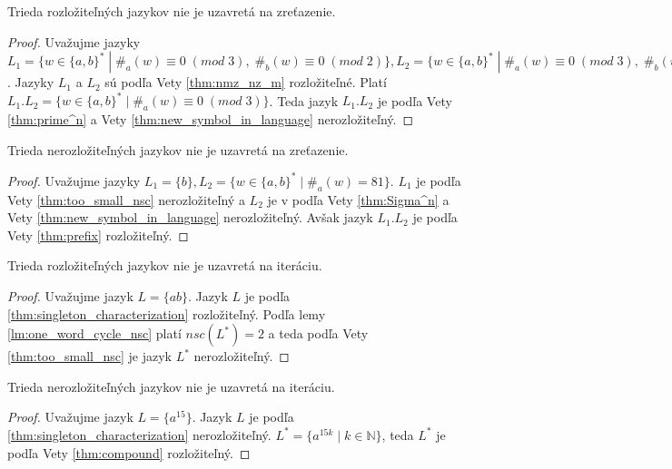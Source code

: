 \begin{theorem}
Trieda rozložiteľných jazykov nie je uzavretá na zreťazenie.
\end{theorem}

\begin{proof}
Uvažujme jazyky $ L_1 = \lbrace w \in \lbrace a,b \rbrace^* \; | \; \#_a(w) \equiv 0 \;  (mod \; 3), \; \#_b(w) \equiv 0 \; (mod \; 2) \rbrace, L_2 = \lbrace w \in \lbrace a,b \rbrace^* \; | \; \#_a(w) \equiv 0 \; (mod \; 3), \; \#_b(w) \equiv 1 \; (mod \; 2) \rbrace \cup \lbrace \varepsilon \rbrace $. Jazyky $ L_1 $ a $ L_2 $ sú podľa Vety \ref{thm:nmz_nz_m} rozložiteľné. Platí $ L_1.L_2 = \lbrace w \in \lbrace a,b \rbrace^* \; | \; \#_a(w) \equiv 0 \; (mod \; 3) \rbrace $. Teda jazyk $ L_1.L_2 $ je podľa Vety \ref{thm:prime^n} a Vety \ref{thm:new_symbol_in_language} nerozložiteľný.
\end{proof}

\begin{theorem}
Trieda nerozložiteľných jazykov nie je uzavretá na zreťazenie.
\end{theorem}

\begin{proof}
Uvažujme jazyky $ L_1 = \lbrace b \rbrace, L_2 = \lbrace w \in \lbrace a,b \rbrace^* \; | \; \#_a(w) = 81 \rbrace $. $ L_1 $ je podľa Vety \ref{thm:too_small_nsc} nerozložiteľný a $ L_2 $ je v podľa Vety \ref{thm:Sigma^n} a Vety \ref{thm:new_symbol_in_language} nerozložiteľný. Avšak jazyk $ L_1.L_2 $ je podľa Vety \ref{thm:prefix} rozložiteľný.
\end{proof}

\begin{theorem}
Trieda rozložiteľných jazykov nie je uzavretá na iteráciu.
\end{theorem}

\begin{proof}
Uvažujme jazyk $ L = \lbrace ab \rbrace $. Jazyk $ L $ je podľa \ref{thm:singleton_characterization} rozložiteľný. Podľa lemy \ref{lm:one_word_cycle_nsc} platí $ nsc(L^*)=2 $ a teda podľa Vety \ref{thm:too_small_nsc} je jazyk $ L^* $ nerozložiteľný.
\end{proof}

\begin{theorem}
Trieda nerozložiteľných jazykov nie je uzavretá na iteráciu.
\end{theorem}

\begin{proof}
Uvažujme jazyk $ L = \lbrace a^15 \rbrace $. Jazyk $ L $ je podľa \ref{thm:singleton_characterization} nerozložiteľný. $ L^* = \lbrace a^{15k} \; | \; k \in \mathbb{N} \rbrace $, teda $ L^* $ je podľa Vety \ref{thm:compound} rozložiteľný.
\end{proof}













